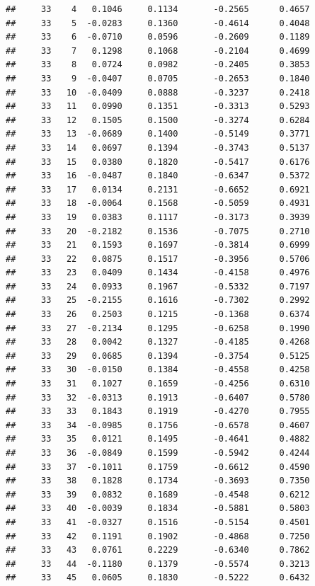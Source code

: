 \documentclass[
]{article}
\begin{document}
\begin{verbatim}
##     33    4   0.1046     0.1134       -0.2565      0.4657  
##     33    5  -0.0283     0.1360       -0.4614      0.4048  
##     33    6  -0.0710     0.0596       -0.2609      0.1189  
##     33    7   0.1298     0.1068       -0.2104      0.4699  
##     33    8   0.0724     0.0982       -0.2405      0.3853  
##     33    9  -0.0407     0.0705       -0.2653      0.1840  
##     33   10  -0.0409     0.0888       -0.3237      0.2418  
##     33   11   0.0990     0.1351       -0.3313      0.5293  
##     33   12   0.1505     0.1500       -0.3274      0.6284  
##     33   13  -0.0689     0.1400       -0.5149      0.3771  
##     33   14   0.0697     0.1394       -0.3743      0.5137  
##     33   15   0.0380     0.1820       -0.5417      0.6176  
##     33   16  -0.0487     0.1840       -0.6347      0.5372  
##     33   17   0.0134     0.2131       -0.6652      0.6921  
##     33   18  -0.0064     0.1568       -0.5059      0.4931  
##     33   19   0.0383     0.1117       -0.3173      0.3939  
##     33   20  -0.2182     0.1536       -0.7075      0.2710  
##     33   21   0.1593     0.1697       -0.3814      0.6999  
##     33   22   0.0875     0.1517       -0.3956      0.5706  
##     33   23   0.0409     0.1434       -0.4158      0.4976  
##     33   24   0.0933     0.1967       -0.5332      0.7197  
##     33   25  -0.2155     0.1616       -0.7302      0.2992  
##     33   26   0.2503     0.1215       -0.1368      0.6374  
##     33   27  -0.2134     0.1295       -0.6258      0.1990  
##     33   28   0.0042     0.1327       -0.4185      0.4268  
##     33   29   0.0685     0.1394       -0.3754      0.5125  
##     33   30  -0.0150     0.1384       -0.4558      0.4258  
##     33   31   0.1027     0.1659       -0.4256      0.6310  
##     33   32  -0.0313     0.1913       -0.6407      0.5780  
##     33   33   0.1843     0.1919       -0.4270      0.7955  
##     33   34  -0.0985     0.1756       -0.6578      0.4607  
##     33   35   0.0121     0.1495       -0.4641      0.4882  
##     33   36  -0.0849     0.1599       -0.5942      0.4244  
##     33   37  -0.1011     0.1759       -0.6612      0.4590  
##     33   38   0.1828     0.1734       -0.3693      0.7350  
##     33   39   0.0832     0.1689       -0.4548      0.6212  
##     33   40  -0.0039     0.1834       -0.5881      0.5803  
##     33   41  -0.0327     0.1516       -0.5154      0.4501  
##     33   42   0.1191     0.1902       -0.4868      0.7250  
##     33   43   0.0761     0.2229       -0.6340      0.7862  
##     33   44  -0.1180     0.1379       -0.5574      0.3213  
##     33   45   0.0605     0.1830       -0.5222      0.6432  

\end{verbatim}
\end{document}
